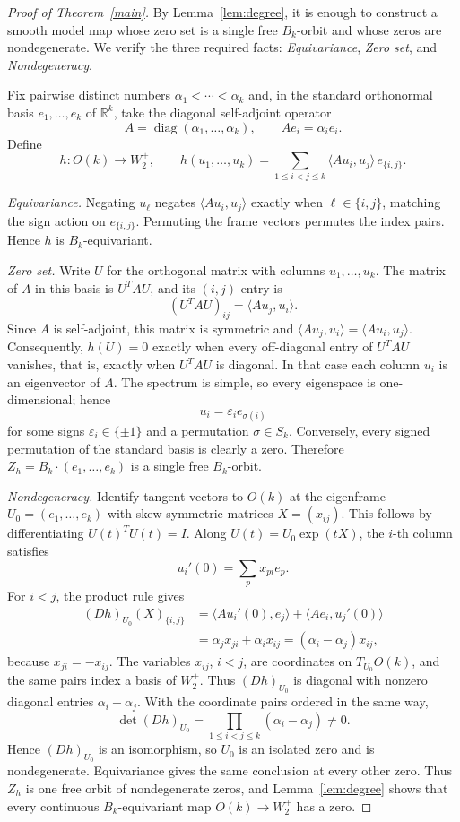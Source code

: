 \documentclass[10pt,a4paper]{amsart}
\begin{document}
\begin{proof}[Proof of Theorem~\ref{main}]
By Lemma~\ref{lem:degree}, it is enough to construct a smooth model map
whose zero set is a single free $B_k$-orbit and whose zeros are
nondegenerate.  We verify the three required facts:
\textit{Equivariance}, \textit{Zero set}, and \textit{Nondegeneracy}.

Fix pairwise distinct numbers $\alpha_1<\cdots<\alpha_k$ and, in the
standard orthonormal basis $e_1,\ldots,e_k$ of $\mathbb{R}^k$, take the
diagonal self-adjoint operator
\[
 A=\operatorname{diag}(\alpha_1,\ldots,\alpha_k),
 \qquad Ae_i=\alpha_i e_i.
\]
Define
\[
 h:O(k)\longrightarrow W_2^+,
 \qquad
 h(u_1,\ldots,u_k)
 =\sum_{1\le i<j\le k}
 \langle Au_i,u_j\rangle\, e_{\{i,j\}}.
\]

\textit{Equivariance.}
Negating $u_\ell$ negates $\langle Au_i,u_j\rangle$ exactly when
$\ell\in\{i,j\}$, matching the sign action on $e_{\{i,j\}}$.
Permuting the frame vectors permutes the index pairs.
Hence $h$ is $B_k$-equivariant.

\textit{Zero set.}
Write $U$ for the orthogonal matrix with columns $u_1,\ldots,u_k$.
The matrix of $A$ in this basis is $U^TAU$, and its $(i,j)$-entry is
\[
 (U^TAU)_{ij}=\langle Au_j,u_i\rangle.
\]
Since $A$ is self-adjoint, this matrix is symmetric and
$\langle Au_j,u_i\rangle=\langle Au_i,u_j\rangle$.  Consequently,
$h(U)=0$ exactly when every off-diagonal entry of $U^TAU$ vanishes,
that is, exactly when $U^TAU$ is diagonal.  In that case each column
$u_i$ is an eigenvector of $A$.  The spectrum is simple, so every
eigenspace is one-dimensional; hence
\[
 u_i=\varepsilon_i e_{\sigma(i)}
\]
for some signs $\varepsilon_i\in\{\pm1\}$ and a permutation
$\sigma\in S_k$.  Conversely, every signed permutation of the standard
basis is clearly a zero.  Therefore
$Z_h=B_k\cdot(e_1,\ldots,e_k)$ is a single free $B_k$-orbit.

\textit{Nondegeneracy.}
Identify tangent vectors to $O(k)$ at the eigenframe
$U_0=(e_1,\ldots,e_k)$ with skew-symmetric matrices $X=(x_{ij})$.
This follows by differentiating $U(t)^TU(t)=I$.  Along
$U(t)=U_0\exp(tX)$, the $i$-th column satisfies
\[
 u_i'(0)=\sum_p x_{pi}e_p.
\]
For $i<j$, the product rule gives
\begin{align*}
 (Dh)_{U_0}(X)_{\{i,j\}}
 &=\langle Au_i'(0),e_j\rangle
   +\langle Ae_i,u_j'(0)\rangle\\
 &=\alpha_jx_{ji}+\alpha_ix_{ij}
  =(\alpha_i-\alpha_j)x_{ij},
\end{align*}
because $x_{ji}=-x_{ij}$.  The variables $x_{ij}$, $i<j$, are
coordinates on $T_{U_0}O(k)$, and the same pairs index a basis of
$W_2^+$.  Thus $(Dh)_{U_0}$ is diagonal with nonzero diagonal entries
$\alpha_i-\alpha_j$.  With the coordinate pairs ordered in the same way,
\[
 \det (Dh)_{U_0}=\prod_{1\le i<j\le k}(\alpha_i-\alpha_j)\ne0.
\]
Hence $(Dh)_{U_0}$ is an isomorphism, so $U_0$ is an isolated zero and
is nondegenerate.  Equivariance gives the same conclusion at every
other zero.  Thus $Z_h$ is one free orbit of nondegenerate zeros, and
Lemma~\ref{lem:degree} shows that every continuous
$B_k$-equivariant map $O(k)\to W_2^+$ has a zero.
\end{proof}
\end{document}
